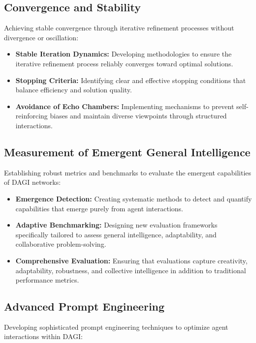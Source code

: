 \documentclass[12pt]{amsart}
\begin{document}
\subsection{Convergence and Stability}

Achieving stable convergence through iterative refinement processes without divergence or oscillation:

\begin{itemize}
    \item \textbf{Stable Iteration Dynamics:} Developing methodologies to ensure the iterative refinement process reliably converges toward optimal solutions.
    \item \textbf{Stopping Criteria:} Identifying clear and effective stopping conditions that balance efficiency and solution quality.
    \item \textbf{Avoidance of Echo Chambers:} Implementing mechanisms to prevent self-reinforcing biases and maintain diverse viewpoints through structured interactions.
\end{itemize}

\subsection{Measurement of Emergent General Intelligence}

Establishing robust metrics and benchmarks to evaluate the emergent capabilities of DAGI networks:

\begin{itemize}
    \item \textbf{Emergence Detection:} Creating systematic methods to detect and quantify capabilities that emerge purely from agent interactions.
    \item \textbf{Adaptive Benchmarking:} Designing new evaluation frameworks specifically tailored to assess general intelligence, adaptability, and collaborative problem-solving.
    \item \textbf{Comprehensive Evaluation:} Ensuring that evaluations capture creativity, adaptability, robustness, and collective intelligence in addition to traditional performance metrics.
\end{itemize}

\subsection{Advanced Prompt Engineering}

Developing sophisticated prompt engineering techniques to optimize agent interactions within DAGI:
\end{document}
